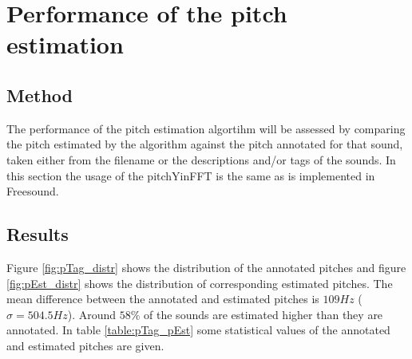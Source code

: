 \documentclass{article}
\begin{document}
\section{Performance of the pitch estimation}
\subsection{Method}
The performance of the pitch estimation algortihm will be assessed by comparing the pitch estimated by the algorithm against the pitch annotated for that sound, taken either from the filename or the descriptions and/or tags of the sounds. In this section the usage of the pitchYinFFT is the same as is implemented in Freesound. 

\subsection{Results}
Figure \ref{fig:pTag_distr} shows the distribution of the annotated pitches and figure \ref{fig:pEst_distr} shows the distribution of corresponding estimated pitches. The mean difference between the annotated and estimated pitches is $109Hz$ ($\sigma = 504.5Hz$). Around $58\%$ of the sounds are estimated higher than they are annotated. In table \ref{table:pTag_pEst} some statistical values of the annotated and estimated pitches are given.
\end{document}
